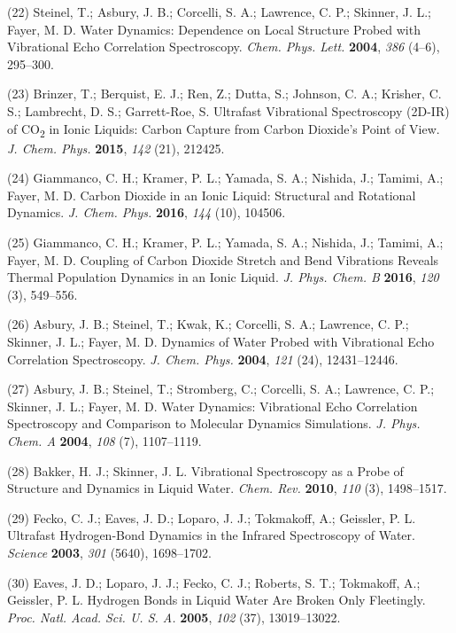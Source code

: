 \documentclass[]{article}
\begin{document}
(22) Steinel, T.; Asbury, J. B.; Corcelli, S. A.; Lawrence, C. P.;
Skinner, J. L.; Fayer, M. D. Water Dynamics: Dependence on Local
Structure Probed with Vibrational Echo Correlation Spectroscopy.
\emph{Chem. Phys. Lett.} \textbf{2004}, \emph{386} (4--6), 295--300.

(23) Brinzer, T.; Berquist, E. J.; Ren, Z.; Dutta, S.; Johnson, C. A.;
Krisher, C. S.; Lambrecht, D. S.; Garrett-Roe, S. Ultrafast Vibrational
Spectroscopy (2D-IR) of CO\textsubscript{2} in Ionic Liquids: Carbon
Capture from Carbon Dioxide's Point of View. \emph{J. Chem. Phys.}
\textbf{2015}, \emph{142} (21), 212425.

(24) Giammanco, C. H.; Kramer, P. L.; Yamada, S. A.; Nishida, J.;
Tamimi, A.; Fayer, M. D. Carbon Dioxide in an Ionic Liquid: Structural
and Rotational Dynamics. \emph{J. Chem. Phys.} \textbf{2016}, \emph{144}
(10), 104506.

(25) Giammanco, C. H.; Kramer, P. L.; Yamada, S. A.; Nishida, J.;
Tamimi, A.; Fayer, M. D. Coupling of Carbon Dioxide Stretch and Bend
Vibrations Reveals Thermal Population Dynamics in an Ionic Liquid.
\emph{J. Phys. Chem. B} \textbf{2016}, \emph{120} (3), 549--556.

(26) Asbury, J. B.; Steinel, T.; Kwak, K.; Corcelli, S. A.; Lawrence, C.
P.; Skinner, J. L.; Fayer, M. D. Dynamics of Water Probed with
Vibrational Echo Correlation Spectroscopy. \emph{J. Chem. Phys.}
\textbf{2004}, \emph{121} (24), 12431--12446.

(27) Asbury, J. B.; Steinel, T.; Stromberg, C.; Corcelli, S. A.;
Lawrence, C. P.; Skinner, J. L.; Fayer, M. D. Water Dynamics:
Vibrational Echo Correlation Spectroscopy and Comparison to Molecular
Dynamics Simulations. \emph{J. Phys. Chem. A} \textbf{2004}, \emph{108}
(7), 1107--1119.

(28) Bakker, H. J.; Skinner, J. L. Vibrational Spectroscopy as a Probe
of Structure and Dynamics in Liquid Water. \emph{Chem. Rev.}
\textbf{2010}, \emph{110} (3), 1498--1517.

(29) Fecko, C. J.; Eaves, J. D.; Loparo, J. J.; Tokmakoff, A.; Geissler,
P. L. Ultrafast Hydrogen-Bond Dynamics in the Infrared Spectroscopy of
Water. \emph{Science} \textbf{2003}, \emph{301} (5640), 1698--1702.

(30) Eaves, J. D.; Loparo, J. J.; Fecko, C. J.; Roberts, S. T.;
Tokmakoff, A.; Geissler, P. L. Hydrogen Bonds in Liquid Water Are Broken
Only Fleetingly. \emph{Proc. Natl. Acad. Sci. U. S. A.} \textbf{2005},
\emph{102} (37), 13019--13022.
\end{document}
